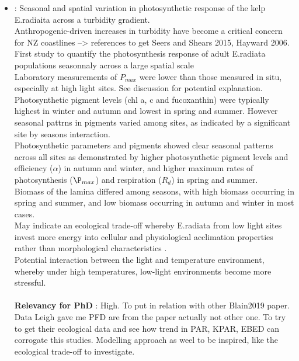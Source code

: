 \documentclass[]{report}
\begin{document}
\begin{itemize}
		\item \cite{blain2019seasonal} : Seasonal and spatial variation in photosynthetic response of the kelp E.radiaita across a turbidity gradient.
		\\Anthropogenic-driven increases in turbidity have become a critical concern for NZ coastlines --> references to get Seers and Shears 2015, Hayward 2006.
		\\First study to quantify the photosynthesis response of adult E.radiata populations seasonnaly across a large spatial scale
		\\Laboratory measurements of $P_{max}$ were lower than those measured in situ, especially at high light sites. See discussion for potential explanation.
		\\Photosynthetic pigment levels (chl a, c and fucoxanthin) were typically highest in winter and autumn and lowest in spring and summer. However seasonal pattrns in pigments varied among sites, as indicated by a significant site by seasons interaction.
		\\Photosynthetic parameters and pigments showed clear seasonal patterns across all sites as demonstrated by higher photosynthetic pigment levels and efficiency ($\alpha$) in autumn and winter, and higher maximum rates of photosynthesis ($\P_{max}$) and respiration ($R_d$) in spring and summer.
		\\Biomass of the lamina differed among seasons, with high biomass occurring in spring and summer, and low biomass occurring in autumn and winter in most cases.
		\\May indicate an ecological trade-off whereby E.radiata from low light sites invest more energy into cellular and physiological acclimation properties rather than morphological characteristics	.
		\\Potential interaction between the light and temperature environment, whereby under high temperatures, low-light environments become more stressful.	
		\\\\\textbf{Relevancy for PhD} : High. 
		To put in relation with other Blain2019 paper. Data Leigh gave me PFD are from the paper actually not other one. To try to get their ecological data and see how trend in PAR, KPAR, EBED can corrogate this studies. Modelling approach as weel to be inspired, like the ecological trade-off to investigate.	
		

\end{itemize}
\end{document}
